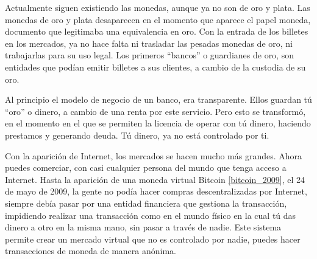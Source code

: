\documentclass[a4paper, 12pt]{book}
\begin{document}
Actualmente siguen existiendo las monedas, aunque ya no son de oro y plata. 
Las monedas de oro y plata desaparecen en el momento que aparece el papel 
moneda, documento que legitimaba una equivalencia en oro. Con la entrada de los 
billetes en los mercados, ya no hace falta ni trasladar las pesadas monedas de 
oro, ni trabajarlas para su uso legal. Los primeros ``bancos'' o guardianes de 
oro, son entidades que podían emitir billetes a sus clientes, a cambio de la 
custodia de su oro.

Al principio el modelo de negocio de un banco, era transparente. Ellos guardan 
tú ``oro'' o dinero, a cambio de una renta por este servicio. Pero esto se 
transformó, en el momento en el que se permiten la licencia de operar con tú 
dinero, haciendo prestamos y generando deuda. Tú dinero, ya no está controlado 
por ti.

Con la aparición de Internet, los mercados se hacen mucho más grandes. Ahora 
puedes comerciar, con casi cualquier persona del mundo que tenga acceso a 
Internet. Hasta la aparición de una moneda virtual Bitcoin \ref{bitcoin_2009}, 
el 24 de mayo de 2009, la gente no podía hacer compras descentralizadas por 
Internet, siempre debía pasar por una entidad financiera que gestiona la 
transacción, impidiendo realizar una transacción como en el mundo físico en la 
cual tú das dinero a otro en la misma mano, sin pasar a través de nadie. 
Este sistema permite crear un mercado virtual que no es controlado por nadie, 
puedes hacer transacciones de moneda de manera anónima.

\end{document}
